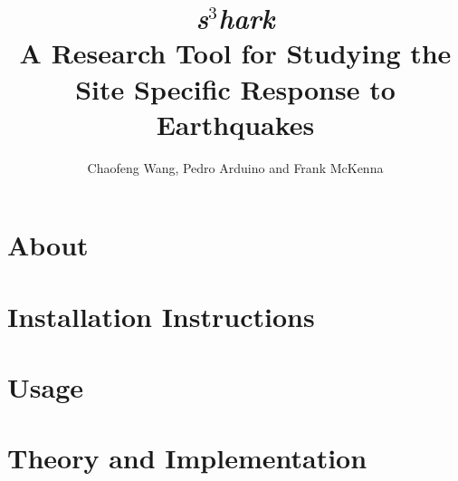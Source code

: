 \documentclass{simcenterdocumentation}
\begin{document}
\title{     {\selectfont \textbf{\textit{s$^3$hark  }} }       \\ A Research Tool for Studying the Site Specific Response to Earthquakes}
\author{Chaofeng Wang, Pedro Arduino and Frank McKenna}

\hypersetup{pageanchor=false}
\maketitle
\copyrightpage
\acknowledgments

\hypersetup{pageanchor=true}
\begin{frontmatter}

\pagestyle{plain}
{
  \renewcommand{\thispagestyle}[1]{}
  \tableofcontents
  \clearpage
  \listoffigures
  \clearpage
  \listoftables
}

\end{frontmatter}
\pagestyle{somewhatsimple}

\chapter{About}
\label{chap:about}


\chapter{Installation Instructions}
\label{chap:installation}


\chapter{Usage}
\label{chap:usage}


\chapter{Theory and Implementation}
\label{chap:theory}

\end{document}
